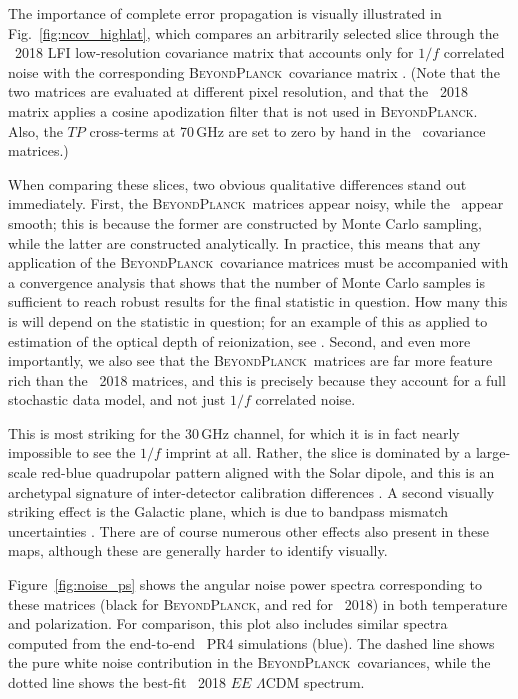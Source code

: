 \documentclass[twocolumn]{aa}
\newcommand{\BP}{\textsc{BeyondPlanck}}
\begin{document}
The importance of complete error propagation is visually illustrated
in Fig.~\ref{fig:ncov_highlat}, which compares an arbitrarily selected
slice through the \Planck\ 2018 LFI low-resolution covariance matrix
that accounts only for $1/f$ correlated noise with the corresponding
\BP\ covariance matrix \citep{planck2016-l05}. (Note that the two
matrices are evaluated at different pixel resolution, and that the
\Planck\ 2018 matrix applies a cosine apodization filter that is not
used in \BP. Also, the $TP$ cross-terms at 70\,GHz are set to zero by
hand in the \Planck\ covariance matrices.)

When comparing these slices, two obvious qualitative differences stand
out immediately. First, the \BP\ matrices appear noisy, while the
\Planck\ appear smooth; this is because the former are constructed by
Monte Carlo sampling, while the latter are constructed
analytically. In practice, this means that any application of the
\BP\ covariance matrices must be accompanied with a convergence
analysis that shows that the number of Monte Carlo samples is
sufficient to reach robust results for the final statistic in
question. How many this is will depend on the statistic in question;
for an example of this as applied to estimation of the optical depth
of reionization, see \citet{bp12}. Second, and even more importantly,
we also see that the \BP\ matrices are far more feature rich than the
\Planck\ 2018 matrices, and this is precisely because they account for
a full stochastic data model, and not just $1/f$ correlated noise. 

This is most striking for the 30\,GHz channel, for which it is in fact
nearly impossible to see the $1/f$ imprint at all. Rather, the slice
is dominated by a large-scale red-blue quadrupolar pattern aligned
with the Solar dipole, and this is an archetypal signature of
inter-detector calibration differences \citep[see,
  e.g.,][]{planck2016-l02,bp07}. A second visually striking effect is
the Galactic plane, which is due to bandpass mismatch uncertainties
\citep{bp09}. There are of course numerous other effects also present
in these maps, although these are generally harder to identify
visually.

Figure~\ref{fig:noise_ps} shows the angular noise power spectra
corresponding to these matrices (black for \BP, and red for
\Planck\ 2018) in both temperature and polarization. For comparison,
this plot also includes similar spectra computed from the end-to-end
\Planck\ PR4 simulations (blue). The dashed line shows the pure white
noise contribution in the \BP\ covariances, while the dotted line
shows the best-fit \Planck\ 2018 $EE$ $\Lambda$CDM spectrum.
\end{document}
